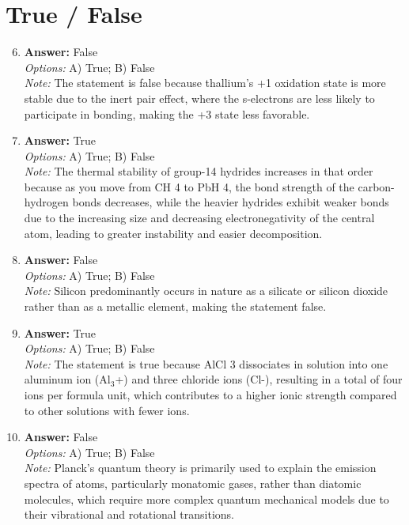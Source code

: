 \documentclass[12pt]{article}
\begin{document}
\section*{True / False}
\begin{enumerate}[label=\arabic*.]
\setcounter{enumi}{5}
\item \textbf{Answer:} False
\\ \textit{Options:} A) True; B) False
\\ \textit{Note:} The statement is false because thallium's +1 oxidation state is more stable due to the inert pair effect, where the s-electrons are less likely to participate in bonding, making the +3 state less favorable.
\item \textbf{Answer:} True
\\ \textit{Options:} A) True; B) False
\\ \textit{Note:} The thermal stability of group-14 hydrides increases in that order because as you move from CH 4 to PbH 4, the bond strength of the carbon-hydrogen bonds decreases, while the heavier hydrides exhibit weaker bonds due to the increasing size and decreasing electronegativity of the central atom, leading to greater instability and easier decomposition.
\item \textbf{Answer:} False
\\ \textit{Options:} A) True; B) False
\\ \textit{Note:} Silicon predominantly occurs in nature as a silicate or silicon dioxide rather than as a metallic element, making the statement false.
\item \textbf{Answer:} True
\\ \textit{Options:} A) True; B) False
\\ \textit{Note:} The statement is true because AlCl 3 dissociates in solution into one aluminum ion (Al$_{3}$+) and three chloride ions (Cl-), resulting in a total of four ions per formula unit, which contributes to a higher ionic strength compared to other solutions with fewer ions.
\item \textbf{Answer:} False
\\ \textit{Options:} A) True; B) False
\\ \textit{Note:} Planck's quantum theory is primarily used to explain the emission spectra of atoms, particularly monatomic gases, rather than diatomic molecules, which require more complex quantum mechanical models due to their vibrational and rotational transitions.
\end{enumerate}
\end{document}
